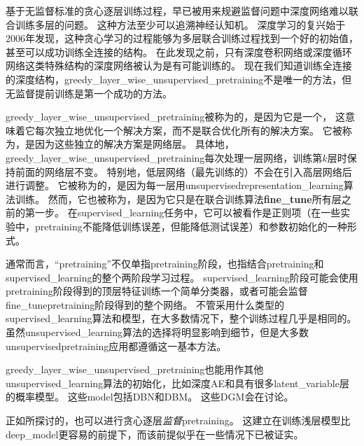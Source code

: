 基于无监督标准的贪心逐层训练过程，早已被用来规避监督问题中深度网络难以联合训练多层的问题。
这种方法至少可以追溯神经认知机\citep{Fukushima75}。
深度学习的复兴始于2006年发现，这种贪心学习的过程能够为多层联合训练过程找到一个好的初始值，甚至可以成功训练全连接的结构\citep{Hinton06-small,Hinton-Science2006,HintonG2006,Bengio-nips-2006,ranzato-07-small}。
在此发现之前，只有深度卷积网络或深度循环网络这类特殊结构的深度网络被认为是有可能训练的。
现在我们知道训练全连接的深度结构，\gls{greedy_layer_wise_unsupervised_pretraining}不是唯一的方法，但无监督提前训练是第一个成功的方法。


\gls{greedy_layer_wise_unsupervised_pretraining}被称为的，是因为它是一个，
这意味着它每次独立地优化一个解决方案，而不是联合优化所有的解决方案。
它被称为，是因为这些独立的解决方案是网络层。
具体地，\gls{greedy_layer_wise_unsupervised_pretraining}每次处理一层网络，训练第$k$层时保持前面的网络层不变。
特别地，低层网络（最先训练的）不会在引入高层网络后进行调整。
它被称为的，是因为每一层用\gls{unsupervised}\gls{representation_learning}算法训练。
然而，它也被称为，是因为它只是在联合训练算法\textbf{\gls{fine_tune}}所有层之前的第一步。
在\gls{supervised_learning}任务中，它可以被看作是正则项（在一些实验中，\gls{pretraining}不能降低训练误差，但能降低测试误差）和参数初始化的一种形式。


通常而言，``\gls{pretraining}''不仅单指\gls{pretraining}阶段，也指结合\gls{pretraining}和\gls{supervised_learning}的整个两阶段学习过程。
\gls{supervised_learning}阶段可能会使用\gls{pretraining}阶段得到的顶层特征训练一个简单分类器，或者可能会监督\gls{fine_tune}\gls{pretraining}阶段得到的整个网络。
不管采用什么类型的\gls{supervised_learning}算法和模型，在大多数情况下，整个训练过程几乎是相同的。
虽然\gls{unsupervised_learning}算法的选择将明显影响到细节，但是大多数\gls{unsupervised}\gls{pretraining}应用都遵循这一基本方法。


\gls{greedy_layer_wise_unsupervised_pretraining}也能用作其他\gls{unsupervised_learning}算法的初始化，比如深度\gls{AE}\citep{Hinton-Science2006}和具有很多\gls{latent_variable}层的概率模型。
这些\gls{model}包括\gls{DBN}\citep{Hinton06-small}和\gls{DBM}\citep{Salakhutdinov+Hinton-2009-small}。
这些\gls{DGM}会在讨论。


正如所探讨的，也可以进行贪心逐层\emph{监督}\gls{pretraining}。
这建立在训练浅层模型比\gls{deep_model}更容易的前提下，而该前提似乎在一些情况下已被证实\citep{Erhan+al-2010-small}。


